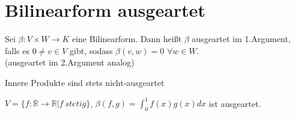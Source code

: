 \section{Bilinearform ausgeartet}
\begin{definition}
Sei $\beta: V \times W \to K$ eine Bilinearform. Dann heißt $\beta$ ausgeartet im 1.Argument, falls es $0 \neq v \in V$ gibt, sodass $\beta(v,w) = 0$ $\forall w \in W$.\\
(ausgeartet im 2.Argument analog)
\end{definition}
\begin{remark}
\leavevmode
\begin{compactitem}
\item Innere Produkte sind stets nicht-ausgeartet
\item $V = \{ f: \mathbb{R} \to \mathbb{R} | f~stetig \}$, $\beta(f,g) = \displaystyle\int_0^1 f(x) g(x) dx$ ist ausgeartet.
\end{compactitem}
\end{remark}
